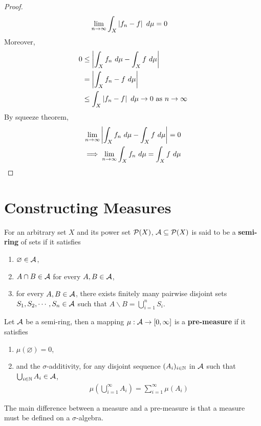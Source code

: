 \documentclass[11pt]{article}
\numberwithin{equation}{section}
\newcommand{\s}[0]{$\sigma$}
\begin{document}
\begin{proof}
	    \begin{align}
	        \lim_{n \to \infty}\int_X \left \vert {f_n - f} \right \vert\ d\mu &= 0 \label{eq:3}
	    \end{align}
	    Moreover,
	    \begin{align}
	        0 &\leq \left \vert {\int_X f_n\ d\mu - \int_X f\ d\mu} \right \vert \\
	        &= \left \vert {\int_X f_n - f\ d\mu} \right \vert \\
	        &\leq \int_X \left \vert {f_n - f} \right \vert\ d\mu \to 0 \text{{ as }} n \to \infty
	    \end{align}
	    By squeeze theorem,
	    \begin{align}
	        \lim_{n \to \infty} \abs{\int_X f_n\ d\mu - \int_X f\ d\mu} = 0 \\
	        \implies \lim_{n \to \infty} \int_X f_n\ d\mu = \int_X f\ d\mu
	    \end{align}
	\end{proof}
	
	\section{Constructing Measures}
	
	\begin{definition}
	    For an arbitrary set $X$ and its power set $\mathcal{{P}}(X)$, $\mathcal{{A}} \subseteq \mathcal{{P}}(X)$ is said to be a \textbf{semi-ring} of sets if it satisfies
	    \begin{enumerate}
	        \item $\varnothing \in \mathcal{{A}}$,
	        \item $A \cap B \in \mathcal{{A}}$ for every $A, B \in \mathcal{{A}}$,
	        \item for every $A, B \in \mathcal{{A}}$, there exists finitely many pairwise disjoint sets $S_1, S_2, \cdots, S_n \in \mathcal{{A}}$ such that $A \backslash B = \bigcup_{i=1}^n S_i$.
	    \end{enumerate}
	\end{definition}
	
	\begin{definition}
	    Let $\mathcal{{A}}$ be a semi-ring, then a mapping $\mu: \mathcal{{A}} \to [0, \infty]$ is a \textbf{pre-measure} if it satisfies
	    \begin{enumerate}
	        \item $\mu(\varnothing) = 0$,
	        \item and the \s-additivity, for any disjoint sequence $(A_i)_{i \in \mathbb{N}}$ in $\mathcal{{A}}$ such that $\bigcup_{i \in \mathbb{N}} A_i \in \mathcal{{A}}$,
	        \begin{align}
	            \mu\left(\bigcup_{i=1}^\infty A_i\right) = \sum_{i=1}^\infty \mu(A_i)
	        \end{align}
	    \end{enumerate}
	    The main difference between a measure and a pre-measure is that a measure must be defined on a \s-algebra.
	\end{definition}
	
\end{document}
